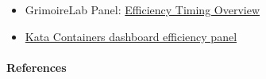 \begin{itemize}
\tightlist
\item
  GrimoireLab Panel:
  \href{https://chaoss.github.io/grimoirelab-sigils/panels/efficiency-timing-overview/}{Efficiency
  Timing Overview}
\item
  \href{https://katacontainers.biterg.io/app/kibana\#/dashboard/cbbdd920-288c-11e9-b662-975152e57997}{Kata
  Containers dashboard efficiency panel}
\end{itemize}

\hypertarget{references}{%
\paragraph{References}\label{references}}
